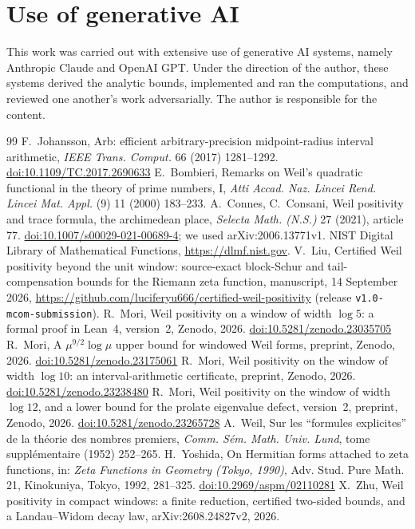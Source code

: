\documentclass[11pt]{amsart}
\newcommand{\doi}[1]{\href{https://doi.org/#1}{doi:#1}}
\theoremstyle{remark}
\numberwithin{equation}{section}
\begin{document}
\section*{Use of generative AI}
This work was carried out with extensive use of generative AI systems, namely Anthropic Claude and OpenAI GPT. Under the direction of the author, these systems derived the analytic bounds, implemented and ran the computations, and reviewed one another's work adversarially. The author is responsible for the content.

\begin{thebibliography}{99}
 F.~Johansson, Arb: efficient arbitrary-precision midpoint-radius interval arithmetic, \emph{IEEE Trans. Comput.} 66 (2017) 1281--1292. \doi{10.1109/TC.2017.2690633}
 E.~Bombieri, Remarks on Weil's quadratic functional in the theory of prime numbers, I, \emph{Atti Accad. Naz. Lincei Rend. Lincei Mat. Appl.} (9) 11 (2000) 183--233.
 A.~Connes, C.~Consani, Weil positivity and trace formula, the archimedean place, \emph{Selecta Math. (N.S.)} 27 (2021), article 77. \doi{10.1007/s00029-021-00689-4}; we used arXiv:2006.13771v1.
 NIST Digital Library of Mathematical Functions, \url{https://dlmf.nist.gov}.
 V.~Liu, Certified Weil positivity beyond the unit window: source-exact block-Schur and tail-compensation bounds for the Riemann zeta function, manuscript, 14 September 2026, \url{https://github.com/luciferyu666/certified-weil-positivity} (release \texttt{v1.0-mcom-submission}).
 R.~Mori, Weil positivity on a window of width $\log5$: a formal proof in Lean~4, version~2, Zenodo, 2026. \doi{10.5281/zenodo.23035705}
 R.~Mori, A $\mu^{9/2}\log\mu$ upper bound for windowed Weil forms, preprint, Zenodo, 2026. \doi{10.5281/zenodo.23175061}
 R.~Mori, Weil positivity on the window of width $\log10$: an interval-arithmetic certificate, preprint, Zenodo, 2026. \doi{10.5281/zenodo.23238480}
 R.~Mori, Weil positivity on the window of width $\log12$, and a lower bound for the prolate eigenvalue defect, version~2, preprint, Zenodo, 2026. \doi{10.5281/zenodo.23265728}
 A.~Weil, Sur les ``formules explicites'' de la th\'eorie des nombres premiers, \emph{Comm. S\'em. Math. Univ. Lund}, tome suppl\'ementaire (1952) 252--265.
 H.~Yoshida, On Hermitian forms attached to zeta functions, in: \emph{Zeta Functions in Geometry (Tokyo, 1990)}, Adv. Stud. Pure Math. 21, Kinokuniya, Tokyo, 1992, 281--325. \doi{10.2969/aspm/02110281}
 X.~Zhu, Weil positivity in compact windows: a finite reduction, certified two-sided bounds, and a Landau--Widom decay law, arXiv:2608.24827v2, 2026.
\end{thebibliography}
\end{document}
